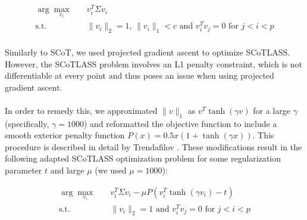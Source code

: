 \documentclass[11pt,letterpaper]{report}
\begin{document}
\begin{equation}
\begin{aligned}
\arg\max_{v_{i}} \quad & v_{i}^{T}\Sigma v_{i}\\
\textrm{s.t.} \quad & \lVert v_{i} \rVert_{2} = 1 \text{, }
            \lVert v_{i} \rVert_{1} < c \text{ and } v_{i}^{T} v_{j} = 0 \text{ for }  j < i < p \\
\end{aligned}
\end{equation}

Similarly to SCoT, we used projected gradient ascent to optimize SCoTLASS. However, the SCoTLASS problem involves an L1 penalty constraint, which is not differentiable at every point and thus poses an issue when using projected gradient ascent.\\
\\
In order to remedy this, we approximated $\lVert v\rVert_{1}$ as $v^T\tanh{(\gamma v)}$ for a large $\gamma$ (specifically, $\gamma = 1000$) and reformatted the objective function to include a smooth exterior penalty function $P(x) = 0.5x(1+\tanh{(\gamma x)})$. This procedure is described in detail by Trendafilov \citeyear{Trendafilov2004}. These modifications result in the following adapted SCoTLASS optimization problem for some regularization parameter $t$ and large $\mu$ (we used $\mu = 1000$):

\begin{equation}
\begin{aligned}
\arg\max_{v_{i}} \quad & v_{i}^{T}\Sigma v_{i} - \mu P(v_{i}^T \tanh{(\gamma v_{i})} - t)\\
\textrm{s.t.} \quad & \lVert v_{i} \rVert_{2} = 1 \text { and } v_{i}^{T}v_{j} = 0 \text{ for }  j < i < p \\
\end{aligned}
\end{equation}
\end{document}
